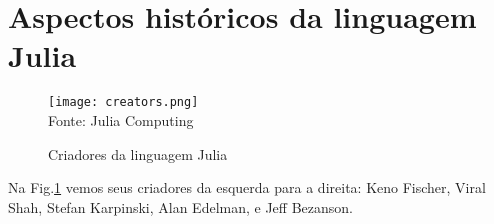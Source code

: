 \newpage
\section{Aspectos históricos da linguagem Julia}

\begin{figure}[H]
   \begin{center}
       \caption{Criadores da linguagem Julia} \label{criadores}
       \texttt{[image: creators.png]} \\
       {\tiny \sf Fonte: Julia Computing}
   \end{center}
  \end{figure}

Na Fig.\ref{criadores} vemos seus criadores da esquerda para a direita: Keno Fischer, Viral Shah, Stefan Karpinski, Alan Edelman, e Jeff Bezanson.
\newline

